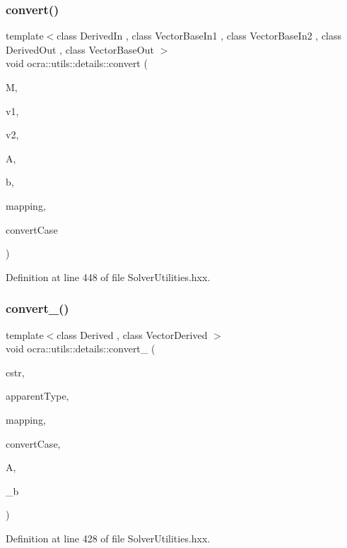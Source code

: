 \subsubsection{\texorpdfstring{convert()}{convert()}}
{\footnotesize\ttfamily template$<$class Derived\+In , class Vector\+Base\+In1 , class Vector\+Base\+In2 , class Derived\+Out , class Vector\+Base\+Out $>$ \\
void ocra\+::utils\+::details\+::convert (\begin{DoxyParamCaption}\item[{const Matrix\+Base$<$ Derived\+In $>$ \&}]{M,  }\item[{const Vector\+Base\+In1 \&}]{v1,  }\item[{const Vector\+Base\+In2 \&}]{v2,  }\item[{Matrix\+Base$<$ Derived\+Out $>$ \&}]{A,  }\item[{Vector\+Base\+Out \&}]{b,  }\item[{const std\+::vector$<$ int $>$ \&}]{mapping,  }\item[{\hyperlink{namespaceocra_1_1utils_1_1details_a617d399055aa54cfdf2d3199ca91c399}{details\+::e\+Convert\+Case}}]{convert\+Case }\end{DoxyParamCaption})\hspace{0.3cm}{\ttfamily [inline]}}



Definition at line 448 of file Solver\+Utilities.\+hxx.

\hypertarget{namespaceocra_1_1utils_1_1details_a47a75bc377ce3547c94c54c6d500fffb}{}\label{namespaceocra_1_1utils_1_1details_a47a75bc377ce3547c94c54c6d500fffb} 
\subsubsection{\texorpdfstring{convert\+\_\+()}{convert\_()}}
{\footnotesize\ttfamily template$<$class Derived , class Vector\+Derived $>$ \\
void ocra\+::utils\+::details\+::convert\+\_\+ (\begin{DoxyParamCaption}\item[{const \hyperlink{namespaceocra_ae8b87cf4099be3efc3b410019ad2046e}{Linear\+Constraint} \&}]{cstr,  }\item[{\hyperlink{namespaceocra_aedff92662043a7f15dc263363db7939b}{e\+Constraint\+Type}}]{apparent\+Type,  }\item[{const std\+::vector$<$ int $>$ \&}]{mapping,  }\item[{\hyperlink{namespaceocra_1_1utils_1_1details_a617d399055aa54cfdf2d3199ca91c399}{e\+Convert\+Case}}]{convert\+Case,  }\item[{Matrix\+Base$<$ Derived $>$ \&}]{A,  }\item[{Matrix\+Base$<$ Vector\+Derived $>$ const \&}]{\+\_\+b }\end{DoxyParamCaption})}



Definition at line 428 of file Solver\+Utilities.\+hxx.

